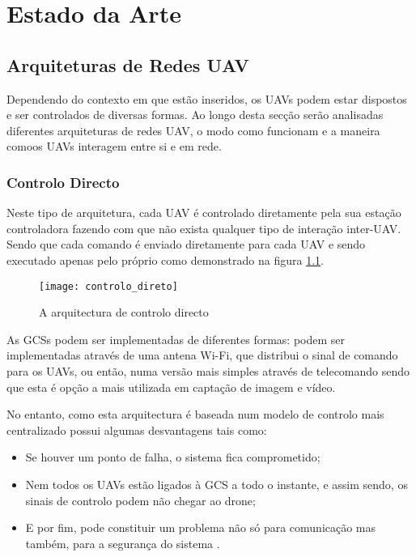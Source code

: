 \chapter{Estado da Arte} \label{chap:sota}

\section{Arquiteturas de Redes UAV}\label{sec:architectures}

Dependendo do contexto em que estão inseridos, os UAVs podem estar dispostos e ser controlados de diversas formas. Ao longo desta secção serão analisadas diferentes arquiteturas de redes UAV, o modo como funcionam e a maneira comoos UAVs interagem  entre si e em rede.

\subsection{Controlo Directo}
Neste tipo de arquitetura, cada UAV é controlado diretamente pela sua estação controladora fazendo com que não exista qualquer tipo de interação inter-UAV. Sendo que cada comando é enviado diretamente para cada UAV e sendo executado apenas pelo próprio como demonstrado na figura \ref{fig:controlo_directo}.

\begin{figure}[H]
\centering
\texttt{[image: controlo\_direto]}
\caption{A arquitectura de controlo directo \label{fig:controlo_directo}}
\end{figure}

As GCSs podem ser implementadas de diferentes formas: podem ser implementadas através de uma antena Wi-Fi, que distribui o sinal de comando para os UAVs, ou então, numa versão mais simples através de telecomando sendo que esta é opção a mais utilizada em captação de imagem e vídeo.

No entanto, como esta arquitectura é baseada num modelo de controlo mais centralizado possui algumas desvantagens tais como: 

\begin{itemize}
\item Se houver um ponto de falha, o sistema fica comprometido;
\item Nem todos os UAVs estão ligados à GCS a todo o instante, e assim sendo, os sinais de controlo podem não chegar ao drone;
\item E por fim, pode constituir um problema não só para comunicação mas também, para a segurança do sistema \cite{ImadJawhar2017}.
\end{itemize}

